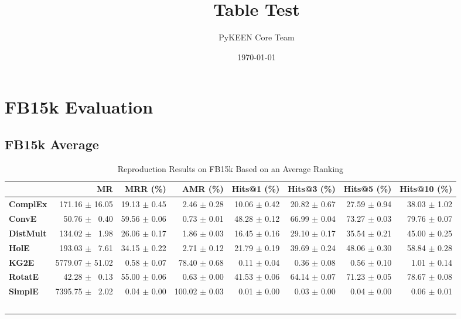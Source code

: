 \documentclass[journal]{IEEEtran}
\title{Table Test}
\author{PyKEEN Core Team}
\date{\today}
\begin{document}
\section{FB15k Evaluation}
\subsection{FB15k Average}
\begin{table*}
    \caption{Reproduction Results on FB15k Based on an Average Ranking}
    \label{tab:fb15k_full_results_average_ranking}
    \centering
    \begin{tabular}{lrrrrrrr}
\toprule
{} &               MR &      MRR (\%) &       AMR (\%) &   Hits@1 (\%) &   Hits@3 (\%) &   Hits@5 (\%) &  Hits@10 (\%) \\
\midrule
\textbf{ComplEx } &  $\phantom{5}$171.16 $\pm$ 16.05 &  19.13 $\pm$ 0.45 &  $\phantom{5}$$\phantom{5}$2.46 $\pm$ 0.28 &  10.06 $\pm$ 0.42 &  20.82 $\pm$ 0.67 &  27.59 $\pm$ 0.94 &  38.03 $\pm$ 1.02 \\
\textbf{ConvE   } &  $\phantom{5}$$\phantom{5}$50.76 $\pm$ $\phantom{5}$0.40 &  59.56 $\pm$ 0.06 &  $\phantom{5}$$\phantom{5}$0.73 $\pm$ 0.01 &  48.28 $\pm$ 0.12 &  66.99 $\pm$ 0.04 &  73.27 $\pm$ 0.03 &  79.76 $\pm$ 0.07 \\
\textbf{DistMult} &  $\phantom{5}$134.02 $\pm$ $\phantom{5}$1.98 &  26.06 $\pm$ 0.17 &  $\phantom{5}$$\phantom{5}$1.86 $\pm$ 0.03 &  16.45 $\pm$ 0.16 &  29.10 $\pm$ 0.17 &  35.54 $\pm$ 0.21 &  45.00 $\pm$ 0.25 \\
\textbf{HolE    } &  $\phantom{5}$193.03 $\pm$ $\phantom{5}$7.61 &  34.15 $\pm$ 0.22 &  $\phantom{5}$$\phantom{5}$2.71 $\pm$ 0.12 &  21.79 $\pm$ 0.19 &  39.69 $\pm$ 0.24 &  48.06 $\pm$ 0.30 &  58.84 $\pm$ 0.28 \\
\textbf{KG2E    } &  5779.07 $\pm$ 51.02 &  $\phantom{5}$0.58 $\pm$ 0.07 &  $\phantom{5}$78.40 $\pm$ 0.68 &  $\phantom{5}$0.11 $\pm$ 0.04 &  $\phantom{5}$0.36 $\pm$ 0.08 &  $\phantom{5}$0.56 $\pm$ 0.10 &  $\phantom{5}$1.01 $\pm$ 0.14 \\
\textbf{RotatE  } &  $\phantom{5}$$\phantom{5}$42.28 $\pm$ $\phantom{5}$0.13 &  55.00 $\pm$ 0.06 &  $\phantom{5}$$\phantom{5}$0.63 $\pm$ 0.00 &  41.53 $\pm$ 0.06 &  64.14 $\pm$ 0.07 &  71.23 $\pm$ 0.05 &  78.67 $\pm$ 0.08 \\
\textbf{SimplE  } &  7395.75 $\pm$ $\phantom{5}$2.02 &  $\phantom{5}$0.04 $\pm$ 0.00 &  100.02 $\pm$ 0.03 &  $\phantom{5}$0.01 $\pm$ 0.00 &  $\phantom{5}$0.03 $\pm$ 0.00 &  $\phantom{5}$0.04 $\pm$ 0.00 &  $\phantom{5}$0.06 $\pm$ 0.01 \\
$$
\end{tabular}
\end{table*}
\end{document}

